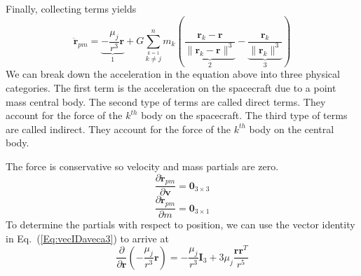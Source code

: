%
Finally, collecting terms yields
%
\begin{equation}
     \mathbf{\ddot{r}}_{pm} = \underbrace{- \frac{\mu_j
     }{r^3}\mathbf{r}}_1  +  G \sum_{\stackrel{k=1}{k \neq j}}^{n} m_k\left( \underbrace{\frac{\mathbf{r}_{k} -
     \mathbf{r}}{\| \mathbf{r}_{k} - \mathbf{r}\|^3}}_2  -
     \underbrace{
      \frac{ \mathbf{r}_{k}}{\|
     \mathbf{r}_{k}\|^3}}_3\right)
\end{equation}
%
We can break down the acceleration in the equation above into three
physical categories.   The first term is the acceleration on the
spacecraft due to a point mass central body.   The second type of
terms are called direct terms.  They account for the force of the
$k^{th}$ body on the spacecraft.  The third type of terms are called
indirect.  They account for the force of the $k^{th}$ body on the
central body.

The force is conservative so velocity and mass partials are zero.
%
\begin{equation}
    \frac{\partial \mathbf{\ddot{r}}_{pm}}{\partial \mathbf{v}}  = \mathbf{0}_{3\times3}
\end{equation}
%
%
\begin{equation}
    \frac{\partial \mathbf{\ddot{r}}_{pm}}{\partial m}  = \mathbf{0}_{3\times1}
\end{equation}
%
To determine the partials with respect to position, we can use the vector identity in
Eq.~(\ref{Eq:vecIDaveca3}) to arrive at
%
\begin{equation}
     \frac{\partial }{\partial \mathbf{r}} \left(- \frac{\mu_j
     }{r^3}\mathbf{r}\right) =  -\frac{\mu_j}{r^3} \mathbf{I}_3
     + 3\mu_j\frac{\mathbf{r}\mathbf{r}^T}{r^5}
\end{equation}

